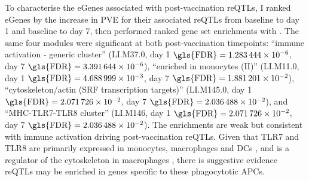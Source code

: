 To characterise the eGenes associated with post-vaccination \glspl{reQTL},
I ranked eGenes by the increase in \gls{PVE} for their associated \glspl{reQTL} from baseline to day 1 and baseline to day 7,
then performed ranked gene set enrichments with .
%
%
The same four modules were significant at both post-vaccination timepoints:
\enquote{immune activation - generic cluster} (LI.M37.0, day 1 $\text{\gls{FDR}} = \num{1.283444e-06}$, day 7 $\text{\gls{FDR}} = \num{3.391644e-06}$),
\enquote{enriched in monocytes (II)} (LI.M11.0, day 1 $\text{\gls{FDR}} = \num{4.688999e-03}$, day 7 $\text{\gls{FDR}} = \num{1.881201e-02}$),
\enquote{cytoskeleton/actin (SRF transcription targets)} (LI.M145.0, day 1 $\text{\gls{FDR}} = \num{2.071726e-02}$, day 7 $\text{\gls{FDR}} = \num{2.036488e-02}$),
and \enquote{MHC-TLR7-TLR8 cluster} (LI.M146, day 1 $\text{\gls{FDR}} = \num{2.071726e-02}$, day 7 $\text{\gls{FDR}} = \num{2.036488e-02}$).
The enrichments are weak but consistent with immune activation driving post-vaccination \glspl{reQTL}.
Given that TLR7 and TLR8 are primarily expressed in monocytes, macrophages and \glspl{DC} \autocite{cervantes2012TLR8ForgottenRelative},
and  is a regulator of the cytoskeleton in macrophages \autocite{sullivan2011SerumResponseFactor}, 
there is suggestive evidence \glspl{reQTL} may be enriched in genes specific to these phagocytotic \glspl{APC}.


